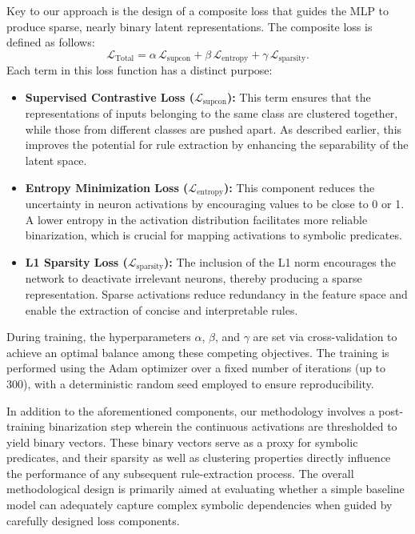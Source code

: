 \documentclass{article}
\begin{document}
Key to our approach is the design of a composite loss that guides the MLP to produce sparse, nearly binary latent representations. The composite loss is defined as follows:
\[
\mathcal{L}_{\text{Total}} = \alpha\,\mathcal{L}_{\text{supcon}} + \beta\,\mathcal{L}_{\text{entropy}} + \gamma\,\mathcal{L}_{\text{sparsity}}.
\]
Each term in this loss function has a distinct purpose:
\begin{itemize}
    \item \textbf{Supervised Contrastive Loss (\(\mathcal{L}_{\text{supcon}}\)):} This term ensures that the representations of inputs belonging to the same class are clustered together, while those from different classes are pushed apart. As described earlier, this improves the potential for rule extraction by enhancing the separability of the latent space.
    \item \textbf{Entropy Minimization Loss (\(\mathcal{L}_{\text{entropy}}\)):} This component reduces the uncertainty in neuron activations by encouraging values to be close to 0 or 1. A lower entropy in the activation distribution facilitates more reliable binarization, which is crucial for mapping activations to symbolic predicates.
    \item \textbf{L1 Sparsity Loss (\(\mathcal{L}_{\text{sparsity}}\)):} The inclusion of the L1 norm encourages the network to deactivate irrelevant neurons, thereby producing a sparse representation. Sparse activations reduce redundancy in the feature space and enable the extraction of concise and interpretable rules.
\end{itemize}

During training, the hyperparameters \(\alpha\), \(\beta\), and \(\gamma\) are set via cross-validation to achieve an optimal balance among these competing objectives. The training is performed using the Adam optimizer over a fixed number of iterations (up to 300), with a deterministic random seed employed to ensure reproducibility.

In addition to the aforementioned components, our methodology involves a post-training binarization step wherein the continuous activations are thresholded to yield binary vectors. These binary vectors serve as a proxy for symbolic predicates, and their sparsity as well as clustering properties directly influence the performance of any subsequent rule-extraction process. The overall methodological design is primarily aimed at evaluating whether a simple baseline model can adequately capture complex symbolic dependencies when guided by carefully designed loss components.
\end{document}
